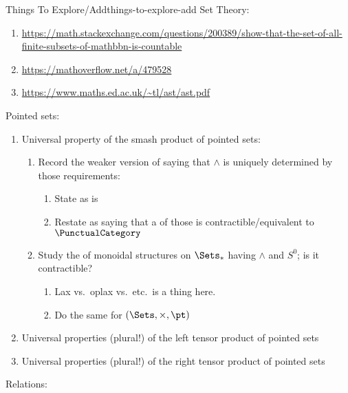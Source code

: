 \begin{remark}{Things To Explore/Add}{things-to-explore-add}%
    Set Theory:
    \begin{enumerate}
        \item \url{https://math.stackexchange.com/questions/200389/show-that-the-set-of-all-finite-subsets-of-mathbbn-is-countable}
        \item \url{https://mathoverflow.net/a/479528}
        \item \url{https://www.maths.ed.ac.uk/~tl/ast/ast.pdf}
    \end{enumerate}
    Pointed sets:
    \begin{enumerate}
        \item Universal property of the smash product of pointed sets:
            \begin{enumerate}
                \item Record the weaker version of  saying that $\wedge$ is uniquely determined by those requirements:
                    \begin{enumerate}
                        \item State as is
                        \item Restate as saying that a  of those is contractible/equivalent to $\PunctualCategory$
                    \end{enumerate}
                \item Study the  of monoidal structures on $\Sets_{*}$ having $\wedge$ and $S^{0}$; is it contractible?
                    \begin{enumerate}
                        \item Lax vs.\ oplax vs.\ etc.\ is a thing here.
                        \item Do the same for $(\Sets,\times,\pt)$
                    \end{enumerate}
            \end{enumerate}
        \item Universal properties (plural!) of the left tensor product of pointed sets
        \item Universal properties (plural!) of the right tensor product of pointed sets
    \end{enumerate}
    Relations:

\end{remark}

